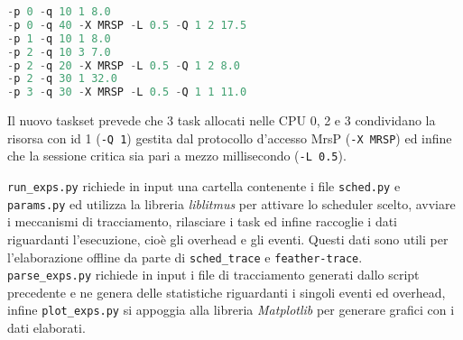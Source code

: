 \begin{appendices}
 \begin{lstlisting}[frame=single,language=Python]  % Start your code-block
-p 0 -q 10 1 8.0
-p 0 -q 40 -X MRSP -L 0.5 -Q 1 2 17.5
-p 1 -q 10 1 8.0
-p 2 -q 10 3 7.0
-p 2 -q 20 -X MRSP -L 0.5 -Q 1 2 8.0
-p 2 -q 30 1 32.0
-p 3 -q 30 -X MRSP -L 0.5 -Q 1 1 11.0
\end{lstlisting}

\noindent Il nuovo taskset prevede che 3 task allocati nelle CPU 0, 2 e 3 condividano la risorsa con id 1 (\texttt{-Q 1}) gestita dal protocollo d'accesso MrsP (\texttt{-X MRSP}) ed infine che la sessione critica sia pari a mezzo millisecondo (\texttt{-L 0.5}).

\noindent \texttt{run\_exps.py} richiede in input una cartella contenente i file \texttt{sched.py} e \texttt{params.py} ed utilizza la libreria \textit{liblitmus} per attivare lo scheduler scelto, avviare i meccanismi di tracciamento, rilasciare i task ed infine raccoglie i dati riguardanti l'esecuzione, cioè gli overhead e gli eventi. Questi dati sono utili per l'elaborazione offline da parte di \texttt{sched\_trace} e \texttt{feather-trace}.\\

\noindent \texttt{parse\_exps.py} richiede in input i file di tracciamento generati dallo script precedente e ne genera delle statistiche riguardanti i singoli eventi ed overhead, infine \texttt{plot\_exps.py} si appoggia alla libreria \textit{Matplotlib} per generare grafici con i dati elaborati.

\end{appendices}